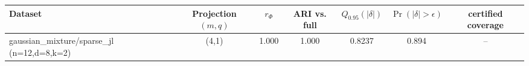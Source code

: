 \begin{tabular}{lcccccc}
\toprule
Dataset & Projection $(m,q)$ & $r_\Phi$ & ARI vs. full & $Q_{0.95}(|\delta|)$ & $\Pr(|\delta|>\epsilon)$ & certified coverage \\
\midrule
gaussian\_mixture/sparse\_jl (n=12,d=8,k=2) & (4,1) & 1.000 & 1.000 & 0.8237 & 0.894 & -- \\
\bottomrule
\end{tabular}
